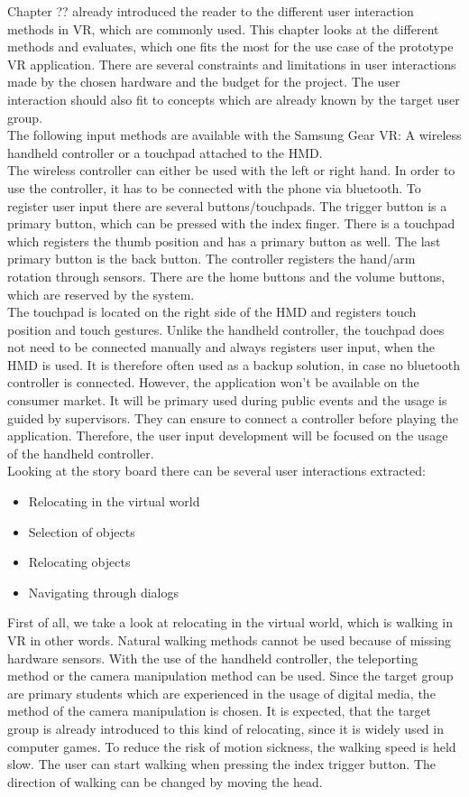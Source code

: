 Chapter ?? already introduced the reader to the different user interaction methods in VR, which are commonly used. This chapter looks at the different methods and evaluates, which one fits the most for the use case of the prototype VR application. There are several constraints and limitations in user interactions made by the chosen hardware and the budget for the project. The user interaction should also fit to concepts which are already known by the target user group.\\
The following input methods are available with the Samsung Gear VR: A wireless handheld controller or a touchpad attached to the HMD. \\
The wireless controller can either be used with the left or right hand. In order to use the controller, it has to be connected with the phone via bluetooth. To register user input there are several buttons/touchpads. The trigger button is a primary button, which can be pressed with the index finger. There is a touchpad which registers the thumb position and has a primary button as well. The last primary button is the back  button. The controller registers the hand/arm rotation through sensors. There are the home buttons and the volume buttons, which are reserved by the system.\\
The touchpad is located on the right side of the HMD and registers touch position and touch gestures. Unlike the handheld controller, the touchpad does not need to be connected manually and always registers user input, when the HMD is used. It is therefore often used as a backup solution, in case no bluetooth controller is connected. However, the application won't be available on the consumer market. It will be primary used during public events and the usage is guided by supervisors. They can ensure to connect a controller before playing the application. Therefore, the user input development will be focused on the usage of the handheld controller.\\
Looking at the story board there can be several user interactions extracted:
\begin{itemize}
\item Relocating in the virtual world
\item Selection of objects
\item Relocating objects
\item Navigating through dialogs
\end{itemize}
First of all, we take a look at relocating in the virtual world, which is walking in VR in other words. Natural walking methods cannot be used because of missing hardware sensors. With the use of the handheld controller, the teleporting method or the camera manipulation method can be used. Since the target group are primary students which are experienced in the usage of digital media, the method of the camera manipulation is chosen. It is expected, that the target group is already introduced to this kind of relocating, since it is widely used in computer games. To reduce the risk of motion sickness, the walking speed is held slow. The user can start walking when pressing the index trigger button. The direction of walking can be changed by moving the head.\\
